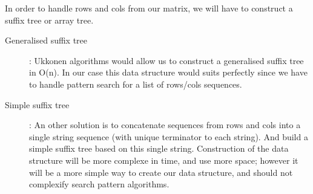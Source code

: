 \par
In order to handle rows and cols from our matrix, we will have to construct a suffix tree or array tree.
\begin{description}
	\item[Generalised suffix tree] : Ukkonen algorithms would allow us to construct a generalised suffix tree in O(n).
	In our case this data structure would suits perfectly since we have to handle pattern search for a list of rows/cols sequences.
	\item[Simple suffix tree] : An other solution is to concatenate sequences from rows and cols into a single string sequence (with unique terminator to each string). And build a simple suffix tree based on this single string. Construction of the data structure will be more complexe in time, and use more space; however it will be a more simple
	way to create our data structure, and should not complexify search pattern algorithms.
\end{description}
